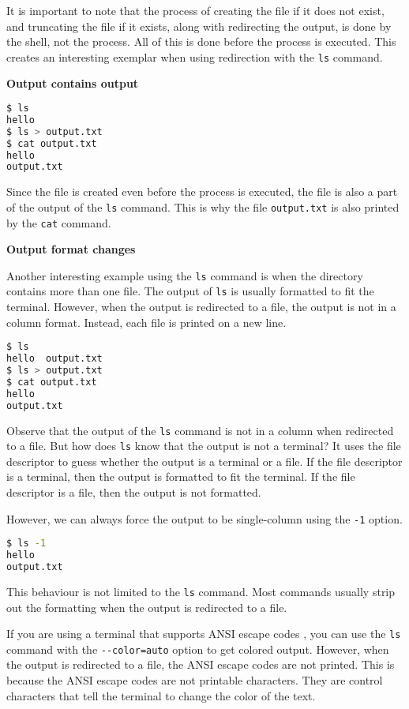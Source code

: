 It is important to note that the process of creating the file if it
does not exist, and truncating the file if it exists, along with redirecting
the output, is done by the shell, not the process. All of this is done
before the process is executed. This creates an interesting exemplar when
using redirection with the \lstinline|ls| command.

\textbf{Output contains output}

\begin{lstlisting}[language=bash]
$ ls
hello
$ ls > output.txt
$ cat output.txt
hello
output.txt
\end{lstlisting}

Since the file is created even before the process is executed, the file
is also a part of the output of the \lstinline|ls| command. This is why the
file \lstinline|output.txt| is also printed by the \lstinline|cat| command.

\textbf{Output format changes}

Another interesting example using the \lstinline|ls| command is when the
directory contains more than one file.
The output of \lstinline|ls| is usually formatted to fit the terminal.
However, when the output is redirected to a file, the output is not
in a column format. Instead, each file is printed on a new line.

\begin{lstlisting}[language=bash]
$ ls
hello  output.txt
$ ls > output.txt
$ cat output.txt
hello
output.txt
\end{lstlisting}

Observe that the output of the \lstinline|ls| command is not in a column
when redirected to a file. But how does \lstinline|ls| know that the output
is not a terminal? It uses the file descriptor to guess whether the
output is a terminal or a file. If the file descriptor is a terminal,
then the output is formatted to fit the terminal. If the file descriptor
is a file, then the output is not formatted.

However, we can always force the output to be single-column using the
\lstinline|-1| option.

\begin{lstlisting}[language=bash]
$ ls -1
hello
output.txt
\end{lstlisting}

This behaviour is not limited to the \lstinline|ls| command. Most commands
usually strip out the formatting when the output is redirected to a file.

If you are using a terminal that supports ANSI escape codes
, you can
use the \lstinline|ls| command with the \lstinline|--color=auto| option to
get colored output. However, when the output is redirected to a file,
the ANSI escape codes are not printed. This is because the ANSI escape
codes are not printable characters. They are control characters that
tell the terminal to change the color of the text.

